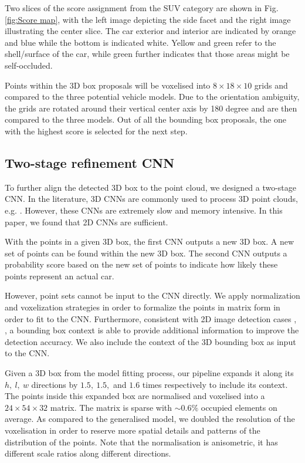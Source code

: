 \documentclass[letterpaper, 10 pt, conference]{ieeeconf}  \usepackage[
\begin{document}
Two slices of the score assignment from the SUV category are shown in Fig. \ref{fig:Score map}, with the left image depicting the side facet and the right image illustrating the center slice. The car exterior and interior are indicated by orange and blue while the bottom is indicated white. Yellow and green refer to the shell/surface of the car, while green further indicates that those areas might be self-occluded.

Points within the 3D box proposals will be voxelised into $8 \times 18 \times 10$ grids and compared to the three potential vehicle models. Due to the orientation ambiguity, the grids are rotated around their vertical center axis by 180 degree and are then compared to the three models. Out of all the bounding box proposals, the one with the highest score is selected for the next step.

\subsection{Two-stage refinement CNN}
To further align the detected 3D box to the point cloud, we designed a two-stage CNN. In the literature, 3D CNNs are commonly used to process 3D point clouds, e.g. \cite{li2016vehicle}. However, these CNNs are extremely slow and memory intensive. In this paper, we found that 2D CNNs are sufficient.

With the points in a given 3D box, the first CNN outputs a new 3D box. A new set of points can be found within the new 3D box. The second CNN outputs a probability score based on the new set of points to indicate how likely these points represent an actual car.

However, point sets cannot be input to the CNN directly. We apply normalization and voxelization strategies in order to formalize the points in matrix form in order to fit to the CNN. Furthermore, consistent with 2D image detection cases \cite{bell2016inside}, \cite{cai2016unified}, a bounding box context is able to provide additional information to improve the detection accuracy. We also include the context of the 3D bounding box as input to the CNN.

Given a 3D box from the model fitting process, our pipeline expands it along its $h,~l,~w$ directions by $1.5, ~1.5,$ and $1.6$ times respectively to include its context. The points inside this expanded box are normalised and voxelised into a $24 \times 54 \times 32$ matrix. The matrix is sparse with $\sim 0.6\%$ occupied elements on average. As compared to the generalised model, we doubled the resolution of the voxelisation in order to reserve more spatial details and patterns of the distribution of the points. Note that the normalisation is anisometric, it has different scale ratios along different directions.
\end{document}
